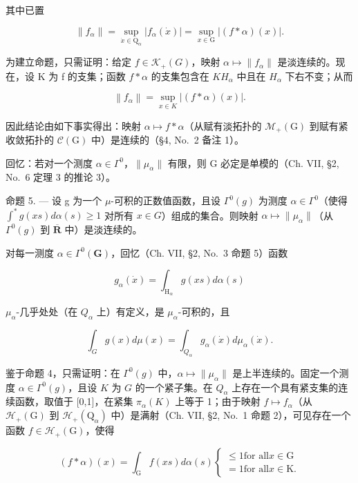 其中已置

\[
\left\| f _ {\alpha} \right\| = \sup _ {\dot {x} \in \mathrm{Q} _ {\alpha}} | f _ {\alpha} (\dot {x}) | = \sup _ {x \in \mathrm{G}} | (f * \alpha) (x) |.\tag{3}
\]

为建立命题，只需证明：给定 \(f \in \mathcal{K}_{+}(G)\)，映射 \(\alpha \mapsto \|f_{\alpha}\|\) 是淡连续的。现在，设 K 为 f 的支集；函数 \(f * \alpha\) 的支集包含在 \(KH_{\alpha}\) 中且在 \(H_{\alpha}\) 下右不变；从而

\[
\left\| f _ {\alpha} \right\| = \sup _ {x \in K} | (f * \alpha) (x) |.
\]

因此结论由如下事实得出：映射 \(\alpha\mapsto f*\alpha\)（从赋有淡拓扑的 \(\mathcal{M}_{+}(\mathrm{G})\) 到赋有紧收敛拓扑的 \(\mathcal{C}(\mathrm{G})\) 中）是连续的（§4, No.~2 备注 1）。

回忆：若对一个测度 \(\alpha \in \Gamma^0\)，\(\| \mu_{\alpha}\|\) 有限，则 G 必定是单模的（Ch. VII, §2, No.~6 定理 3 的推论 3）。

命题 5. --- 设 g 为一个 \(\mu\)-可积的正数值函数，且设 \(\Gamma^{0}(g)\) 为测度 \(\alpha\in\Gamma^{0}\)（使得 \(\int^{*}g(xs)d\alpha(s)\geqslant1\) 对所有 \(x\in G\)）组成的集合。则映射 \(\alpha\mapsto\|\mu_{\alpha}\|\)（从 \(\Gamma^{0}(g)\) 到 \(\overline{\mathbf{R}}\) 中）是淡连续的。

对每一测度 \(\alpha \in \Gamma^0 (\mathbf{G})\)，回忆（Ch. VII, §2, No.~3 命题 5）函数

\[
g _ {\alpha} (\dot {x}) = \int_ {\mathrm{H} _ {\alpha}} g (x s) d \alpha (s)
\]

\(\mu_{\alpha}\)-几乎处处（在 \(Q_{\alpha}\) 上）有定义，是 \(\mu_{\alpha}\)-可积的，且

\[
\int_ {G} g (x) d \mu (x) = \int_ {Q _ {\alpha}} g _ {\alpha} (\dot {x}) d \mu_ {\alpha} (\dot {x}).\tag{4}
\]

鉴于命题 4，只需证明：在 \(\Gamma^0(g)\) 中，\(\alpha \mapsto \| \mu_\alpha \|\) 是上半连续的。固定一个测度 \(\alpha \in \Gamma^0(g)\)，且设 \(K\) 为 \(G\) 的一个紧子集。在 \(Q_\alpha\) 上存在一个具有紧支集的连续函数，取值于 {[}0,1{]}，在紧集 \(\pi_\alpha(K)\) 上等于 1；由于映射 \(f \mapsto f_\alpha\)（从 \(\mathcal{H}_+(\mathrm{G})\) 到 \(\mathcal{H}_+(\mathrm{Q}_\alpha)\) 中）是满射（Ch. VII, §2, No.~1 命题 2），可见存在一个函数 \(f \in \mathcal{H}_+(\mathrm{G})\)，使得

\[
(f * \alpha) (x) = \int_ {\mathrm{G}} f (x s)   d \alpha (s) \left\{ \begin{array}{l} \leqslant 1 \text {for all} x \in \mathrm{G} \\ = 1 \text {for all} x \in \mathrm{K}. \end{array} \right.
\]

